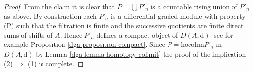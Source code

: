 \begin{proof}
\medskip\noindent
From the claim it is clear that $P = \bigcup P'_n$
is a countable rising union of $P'_n$ as above.
By construction each $P'_n$ is a differential graded module with
property (P) such that the filtration is finite and the successive
quotients are finite direct sums of shifts of $A$. Hence $P'_n$
defines a compact object of $D(A, \text{d})$, see for example
Proposition \ref{dga-proposition-compact}. Since
$P = \text{hocolim} P'_n$ in $D(A, \text{d})$
by Lemma \ref{dga-lemma-homotopy-colimit}
the proof of the implication (2) $\Rightarrow$ (1) is complete.
\end{proof}



